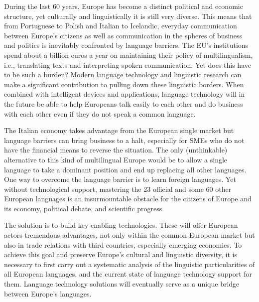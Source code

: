 \documentclass[]{../../metanetpaper}
\begin{document}
\begin{multicols}{2}

During the last 60 years, Europe has become a distinct political and economic
structure, yet culturally and linguistically it is still very diverse. This
means that from Portuguese to Polish and Italian to Icelandic, everyday
communication between Europe's citizens as well as communication in the
spheres of business and politics is inevitably confronted by language
barriers. The EU's institutions spend about a billion euros a year on
maintaining their policy of multilingualism, i.e., translating texts and
interpreting spoken communication. Yet does this have to be such a burden?
Modern language technology and linguistic research can make a significant
contribution to pulling down these linguistic borders. When combined with
intelligent devices and applications, language technology will in the future
be able to help Europeans talk easily to each other and do business with each
other even if they do not speak a common language.




The Italian economy takes advantage from the European single market but
language barriers can bring business to a halt, especially for SMEs who do not
have the financial means to reverse the situation. The only (unthinkable)
alternative to this kind of multilingual Europe would be to allow a single
language to take a dominant position and end up replacing all other
languages. One way to overcome the language barrier is to learn
foreign languages. Yet without technological support, mastering the 23 official and
some 60 other European languages is an insurmountable obstacle for the
citizens of Europe and its economy, political debate, and scientific progress.

The solution is to build key enabling technologies. These will offer European
actors tremendous advantages, not only within the common European market but
also in trade relations with third countries, especially emerging economies.
To achieve this goal and preserve Europe's cultural and linguistic
diversity, it is necessary to first carry out a systematic analysis of the
linguistic particularities of all European languages, and the current state of
language technology support for them. Language technology solutions will
eventually serve as a unique bridge between Europe's languages.
 

\end{multicols}
\end{document}
